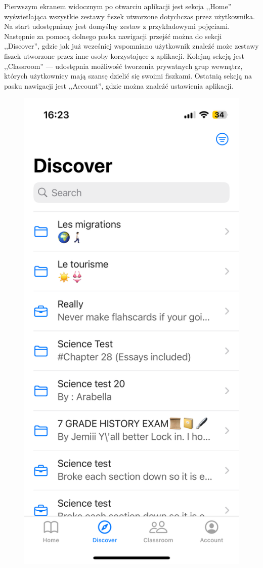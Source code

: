 \documentclass[final,a4paper,openany,12pt]{mwbk}
\begin{document}
Pierwszym ekranem widocznym po otwarciu aplikacji jest sekcja ,,Home'' wyświetlająca wszystkie zestawy fiszek utworzone dotychczas przez użytkownika. Na start udostępniany jest domyślny zestaw z przykładowymi pojęciami. Następnie za pomocą dolnego paska nawigacji przejść można do sekcji ,,Discover'', gdzie jak już wcześniej wspomniano użytkownik znaleźć może zestawy fiszek utworzone przez inne osoby korzystające z aplikacji. Kolejną sekcją jest ,,Classroom'' --- udostępnia możliwość tworzenia prywatnych grup wewnątrz, których użytkownicy mają szansę dzielić się swoimi fiszkami. Ostatnią sekcją na pasku nawigacji jest ,,Account'', gdzie można znaleźć ustawienia aplikacji.

\begin{figure}[H]
\centering
\begin{minipage}{0.5\textwidth}
  \centering
\includegraphics[width=.75\linewidth]{img/flashcards3.PNG}

\end{minipage}
\end{figure}
\end{document}
